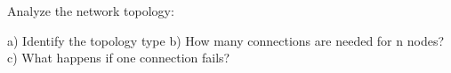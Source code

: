 \documentclass[12pt]{article}
\begin{document}
Analyze the network topology:


a) Identify the topology type
b) How many connections are needed for n nodes?
c) What happens if one connection fails?
\end{document}
